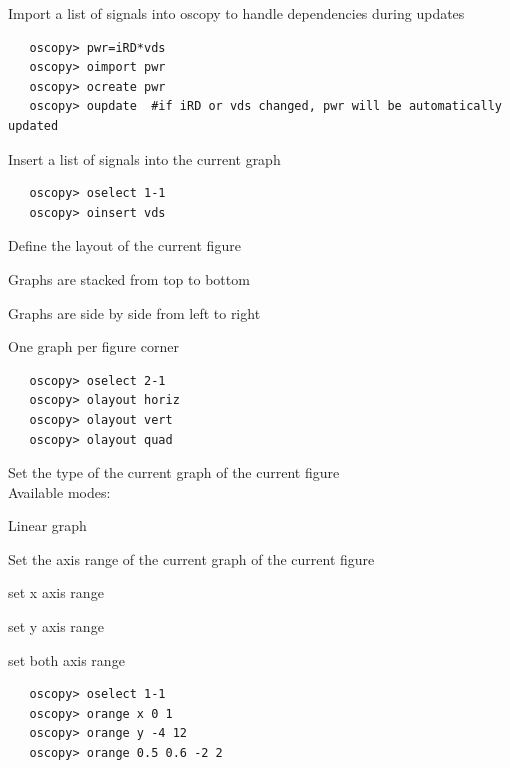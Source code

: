 \documentclass[a4paper,11pt]{report}
\renewenvironment{description}{%
\begin{basedescript}{%
\renewcommand{\makelabel}[1]{\bfseries##1}%
}%
}{%
\end{basedescript}%
}
\begin{document}
   Import a list of signals into oscopy to handle dependencies during updates
\begin{lstlisting}
   oscopy> pwr=iRD*vds
   oscopy> oimport pwr
   oscopy> ocreate pwr
   oscopy> oupdate  #if iRD or vds changed, pwr will be automatically updated
\end{lstlisting}

   Insert a list of signals into the current graph
\begin{lstlisting}
   oscopy> oselect 1-1
   oscopy> oinsert vds
\end{lstlisting}

   Define the layout of the current figure
   \begin{description}
   \item[olayout horiz] Graphs are stacked from top to bottom
   \item[olayout vert] Graphs are side by side from left to right
   \item[olayout quad] One graph per figure corner
   \end{description}
\begin{lstlisting}
   oscopy> oselect 2-1
   oscopy> olayout horiz
   oscopy> olayout vert
   oscopy> olayout quad
\end{lstlisting}

   Set the type of the current graph of the current figure\\
   Available modes:
   \begin{description}
   \item[omode lin]      Linear graph
   \end{description}

   Set the axis range of the current graph of the current figure
   \begin{description}
   \item[orange x xmin xmax] set x axis range
   \item[orange y ymin ymax] set y axis range
   \item[orange xmin xmax ymin ymax] set both axis range
   \end{description}
\begin{lstlisting}
   oscopy> oselect 1-1
   oscopy> orange x 0 1
   oscopy> orange y -4 12
   oscopy> orange 0.5 0.6 -2 2
\end{lstlisting}
\end{document}
